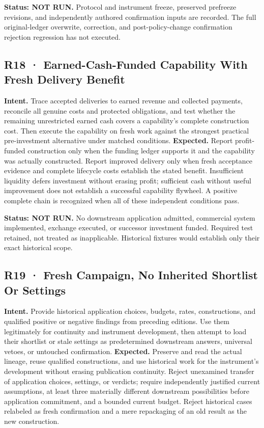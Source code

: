\documentclass[10pt,letterpaper]{article}
\begin{document}
\textbf{Status: NOT RUN.} Protocol and instrument freeze, preserved
prefreeze revisions, and independently authored confirmation inputs are
recorded. The full original-ledger overwrite, correction, and
post-policy-change confirmation rejection regression has not executed.

\hypertarget{r18-earned-cash-funded-capability-with-fresh-delivery-benefit}{%
\subsection{R18 · Earned-Cash-Funded Capability With Fresh Delivery
Benefit}\label{r18-earned-cash-funded-capability-with-fresh-delivery-benefit}}

\textbf{Intent.} Trace accepted deliveries to earned revenue and
collected payments, reconcile all genuine costs and protected
obligations, and test whether the remaining unrestricted earned cash
covers a capability's complete construction cost. Then execute the
capability on fresh work against the strongest practical pre-investment
alternative under matched conditions. \textbf{Expected.} Report
profit-funded construction only when the funding ledger supports it and
the capability was actually constructed. Report improved delivery only
when fresh acceptance evidence and complete lifecycle costs establish
the stated benefit. Insufficient liquidity defers investment without
erasing profit; sufficient cash without useful improvement does not
establish a successful capability flywheel. A positive complete chain is
recognized when all of these independent conditions pass.

\textbf{Status: NOT RUN.} No downstream application admitted, commercial
system implemented, exchange executed, or successor investment funded.
Required test retained, not treated as inapplicable. Historical fixtures
would establish only their exact historical scope.

\hypertarget{r19-fresh-campaign-no-inherited-shortlist-or-settings}{%
\subsection{R19 · Fresh Campaign, No Inherited Shortlist Or
Settings}\label{r19-fresh-campaign-no-inherited-shortlist-or-settings}}

\textbf{Intent.} Provide historical application choices, budgets, rates,
constructions, and qualified positive or negative findings from
preceding editions. Use them legitimately for continuity and instrument
development, then attempt to load their shortlist or stale settings as
predetermined downstream answers, universal vetoes, or untouched
confirmation. \textbf{Expected.} Preserve and read the actual lineage,
reuse qualified constructions, and use historical work for the
instrument's development without erasing publication continuity. Reject
unexamined transfer of application choices, settings, or verdicts;
require independently justified current assumptions, at least three
materially different downstream possibilities before application
commitment, and a bounded current budget. Reject historical cases
relabeled as fresh confirmation and a mere repackaging of an old result
as the new construction.
\end{document}
